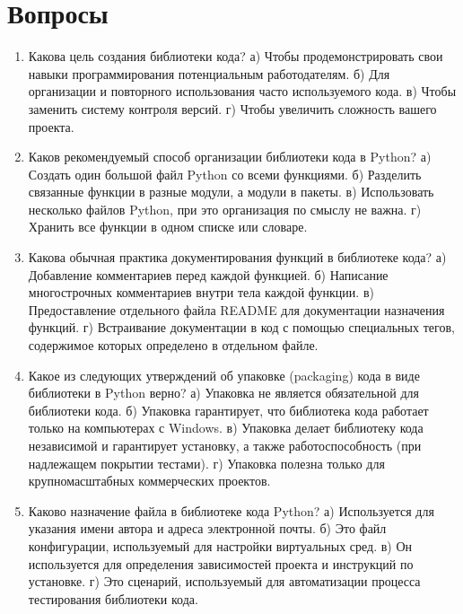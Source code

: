\documentclass[letterpaper,10pt,russian]{sphinxmanual}
\begin{document}
\section{Вопросы}
\label{\detokenize{educational_materials/code_to_lib/quiz:id1}}\label{\detokenize{educational_materials/code_to_lib/quiz::doc}}\begin{enumerate}
%
\item {} 
\sphinxAtStartPar
Какова цель создания библиотеки кода?
а) Чтобы продемонстрировать свои навыки программирования потенциальным работодателям.
б) Для организации и повторного использования часто используемого кода.
в) Чтобы заменить систему контроля версий.
г) Чтобы увеличить сложность вашего проекта.

\item {} 
\sphinxAtStartPar
Каков рекомендуемый способ организации библиотеки кода в Python?
а) Создать один большой файл Python со всеми функциями.
б) Разделить связанные функции в разные модули, а модули в пакеты.
в) Использовать несколько файлов Python, при это организация по смыслу не важна.
г) Хранить все функции в одном списке или словаре.

\item {} 
\sphinxAtStartPar
Какова обычная практика документирования функций в библиотеке кода?
а) Добавление комментариев перед каждой функцией.
б) Написание многострочных комментариев внутри тела каждой функции.
в) Предоставление отдельного файла README для документации назначения функций.
г) Встраивание документации в код с помощью специальных тегов, содержимое которых определено в отдельном файле.

\item {} 
\sphinxAtStartPar
Какое из следующих утверждений об упаковке (packaging) кода в виде библиотеки в Python верно?
а) Упаковка не является обязательной для библиотеки кода.
б) Упаковка гарантирует, что библиотека кода работает только на компьютерах с Windows.
в) Упаковка делает библиотеку кода независимой и гарантирует установку, а также работоспособность (при надлежащем покрытии тестами).
г) Упаковка полезна только для крупномасштабных коммерческих проектов.

\item {} 
\sphinxAtStartPar
Каково назначение файла  в библиотеке кода Python?
а) Используется для указания имени автора и адреса электронной почты.
б) Это файл конфигурации, используемый для настройки виртуальных сред.
в) Он используется для определения зависимостей проекта и инструкций по установке.
г) Это сценарий, используемый для автоматизации процесса тестирования библиотеки кода.


\end{enumerate}
\end{document}

